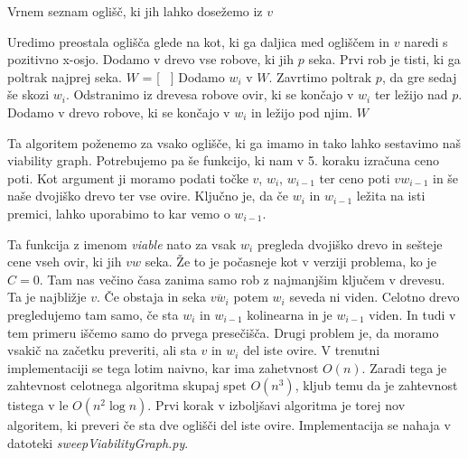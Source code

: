 \documentclass{article}
\begin{document}
\begin{algorithm}
    \caption{Vrnem seznam oglišč, ki jih lahko dosežemo iz $v$}
    \begin{algorithmic}[1]
        \State Uredimo preostala oglišča glede na kot, ki ga daljica med ogliščem in $v$ naredi s pozitivno x-osjo.
        \State  Dodamo v drevo vse robove, ki jih $p$ seka. Prvi rob je tisti, ki ga poltrak najprej seka.
        \State $W$ = [ \ ]
            \State Dodamo $w_i$ v $W$.
        \EndIf
        \State Zavrtimo poltrak $p$, da gre sedaj še skozi $w_i$.
        \State Odstranimo iz drevesa robove ovir, ki se končajo v $w_i$ ter ležijo nad $p$.
        \State Dodamo v drevo robove, ki se končajo v $w_i$ in ležijo pod njim.
        \EndFor
        \State \Return $W$
    \end{algorithmic}
\end{algorithm}

Ta algoritem poženemo za vsako oglišče, ki ga imamo in tako lahko sestavimo naš viability graph. Potrebujemo pa še funkcijo, ki nam v 5. koraku izračuna ceno poti. Kot argument ji moramo podati točke $v$, $w_i$, $w_{i-1}$ ter ceno poti $vw_{i-1}$ in še naše dvojiško drevo ter vse ovire. Ključno je, da če $w_i$ in $w_{i-1}$ ležita na isti premici, lahko uporabimo to kar vemo o $w_{i-1}$.

Ta funkcija z imenom \emph{viable} nato za vsak $w_i$ pregleda dvojiško drevo in sešteje cene vseh ovir, ki jih $vw$ seka. Že to je počasneje kot v verziji problema, ko je $C = 0$. Tam nas večino časa zanima samo rob z najmanjšim ključem v drevesu. Ta je najbližje $v$. Če obstaja in seka $\overline{vw_i}$ potem $w_i$ seveda ni viden. Celotno drevo pregledujemo tam samo, če sta $w_i$ in $w_{i-1}$ kolinearna in je $w_{i-1}$ viden. In tudi v tem primeru iščemo samo do prvega presečišča. Drugi problem je, da moramo vsakič na začetku preveriti, ali sta $v$ in $w_i$ del iste ovire. V trenutni implementaciji se tega lotim naivno, kar ima zahetvnost $O(n)$. Zaradi tega je zahtevnost celotnega algoritma skupaj spet $O(n^3)$, kljub temu da je zahtevnost tistega v \cite{BCKO} le $O(n^2 \log n)$. Prvi korak v izboljšavi algoritma je torej nov algoritem, ki preveri če sta dve oglišči del iste ovire. Implementacija se nahaja v datoteki \emph{sweepViabilityGraph.py}.
\end{document}

